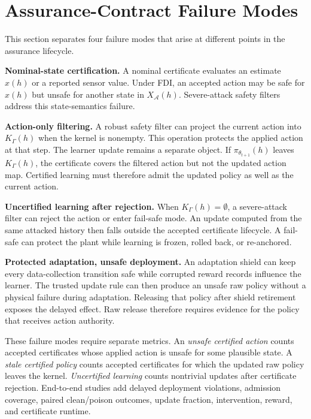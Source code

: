 \section{Assurance-Contract Failure Modes}
\label{sec:lifecycle-attacks}

This section separates four failure modes that arise at different points in
the assurance lifecycle.

\textbf{Nominal-state certification.}
A nominal certificate evaluates an estimate $\hat x(h)$ or a reported sensor
value.  Under FDI, an accepted action may be safe for $\hat x(h)$ but unsafe
for another state in $X_{\mathcal A}(h)$.  Severe-attack safety filters address
this state-semantics failure.

\textbf{Action-only filtering.}
A robust safety filter can project the current action into $K_\Gamma(h)$ when
the kernel is nonempty.  This operation protects the applied action at that
step.  The learner update remains a separate object.  If
$\pi_{\theta_{t+1}}(h)$ leaves $K_\Gamma(h)$, the certificate covers the
filtered action but not the updated action map.  Certified learning must
therefore admit the updated policy as well as the current action.

\textbf{Uncertified learning after rejection.}
When $K_\Gamma(h)=\emptyset$, a severe-attack filter can reject the action or
enter fail-safe mode.  An update computed from the same attacked history then
falls outside the accepted certificate lifecycle.  A fail-safe can protect the
plant while learning is frozen, rolled back, or re-anchored.

\textbf{Protected adaptation, unsafe deployment.}
An adaptation shield can keep every data-collection transition safe while
corrupted reward records influence the learner.  The trusted update rule can
then produce an unsafe raw policy without a physical failure during
adaptation.  Releasing that policy after shield retirement exposes the delayed
effect.  Raw release therefore requires evidence for the policy that receives
action authority.

These failure modes require separate metrics.  An \emph{unsafe certified action}
counts accepted certificates whose applied action is unsafe for some plausible
state.  A \emph{stale certified policy} counts accepted certificates for which
the updated raw policy leaves the kernel.  \emph{Uncertified learning} counts
nontrivial updates after certificate rejection.  End-to-end studies
add delayed deployment violations, admission coverage, paired clean/poison
outcomes, update fraction, intervention, reward, and certificate runtime.
